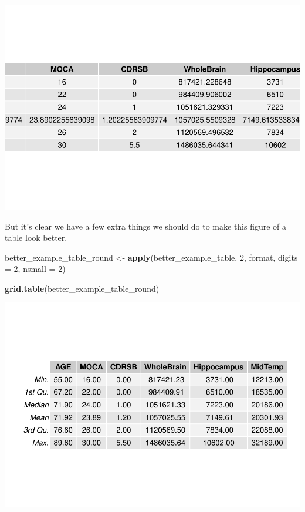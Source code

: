 \documentclass[]{article}
\newenvironment{Shaded}{\begin{snugshade}}{\end{snugshade}}
\newcommand{\DataTypeTok}[1]{\textcolor[rgb]{0.13,0.29,0.53}{#1}}
\newcommand{\DecValTok}[1]{\textcolor[rgb]{0.00,0.00,0.81}{#1}}
\newcommand{\KeywordTok}[1]{\textcolor[rgb]{0.13,0.29,0.53}{\textbf{#1}}}
\newcommand{\NormalTok}[1]{#1}
\newcommand{\StringTok}[1]{\textcolor[rgb]{0.31,0.60,0.02}{#1}}
\begin{document}
\includegraphics{1_a_Simple_RMarkdown_PDF_files/figure-latex/grid_and_gridExtra-1.pdf}

But it's clear we have a few extra things we should do to make this
figure of a table look better.

\begin{Shaded}
\begin{Highlighting}[]
\NormalTok{better_example_table_round <-}\StringTok{ }\KeywordTok{apply}\NormalTok{(better_example_table, }\DecValTok{2}\NormalTok{, }
\NormalTok{    format, }\DataTypeTok{digits =} \DecValTok{2}\NormalTok{, }\DataTypeTok{nsmall =} \DecValTok{2}\NormalTok{)}

\KeywordTok{grid.table}\NormalTok{(better_example_table_round)}
\end{Highlighting}
\end{Shaded}

\includegraphics{1_a_Simple_RMarkdown_PDF_files/figure-latex/grid_and_gridExtra_round-1.pdf}
\end{document}
